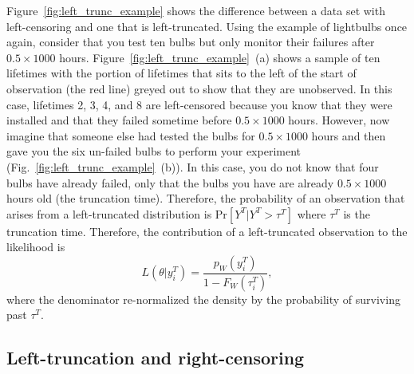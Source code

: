 Figure~\ref{fig:left_trunc_example} shows the difference between a data set with left-censoring and one that is left-truncated. Using the example of lightbulbs once again, consider that you test ten bulbs but only monitor their failures after $0.5 \times 1000$ hours. Figure~\ref{fig:left_trunc_example}~(a) shows a sample of ten lifetimes with the portion of lifetimes that sits to the left of the start of observation (the red line) greyed out to show that they are unobserved. In this case, lifetimes 2, 3, 4, and 8 are left-censored because you know that they were installed and that they failed sometime before $0.5 \times 1000$ hours. However, now imagine that someone else had tested the bulbs for $0.5 \times 1000$ hours and then gave you the six un-failed bulbs to perform your experiment (Fig.~\ref{fig:left_trunc_example}~(b)). In this case, you do not know that four bulbs have already failed, only that the bulbs you have are already $0.5 \times 1000$ hours old (the truncation time). Therefore, the probability of an observation that arises from a left-truncated distribution is $\text{Pr}\left[Y^T|Y^T > \tau^T\right]$ where $\tau^T$ is the truncation time. Therefore, the contribution of a left-truncated observation to the likelihood is
\begin{equation}
    \label{eq:left_trunc}
    L\left(\theta|y^T_i\right) = \frac{p_W\left(y^T_i\right)}{1 - F_W\left(\tau^{T}_i\right)},
\end{equation}
where the denominator re-normalized the density by the probability of surviving past $\tau^T$.

\subsection{Left-truncation and right-censoring} 

